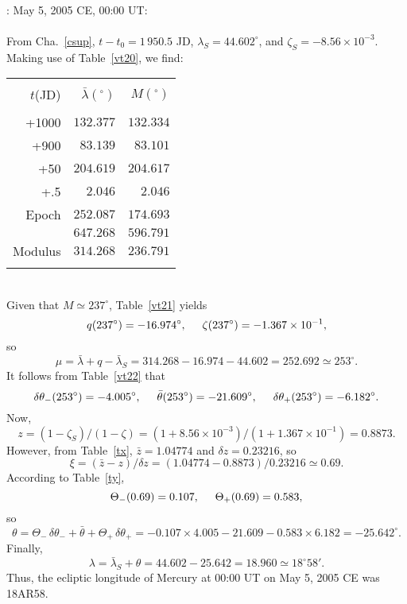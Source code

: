 ~\\
: May 5,  2005 CE, 00:00 UT:\\
~\\
From Cha.~\ref{csup}, $t-t_0=1\,950.5$ JD, $\lambda_S= 44.602^\circ$, and
$\zeta_S= -8.56\times 10^{-3}$. Making use of
Table~\ref{vt20}, we find:\\
\begin{tabular}{rrr}
&&\\
$t$(JD) & $ \bar{\lambda}(^\circ)$ & $M(^\circ)$\\[-2ex]
&&\\
+1000 & $132.377$ & $132.334$\\
+900 & $83.139$ & $83.101$\\
+50 & $204.619$ & $204.617$\\
+.5 & $2.046$ & $2.046$\\
Epoch & $252.087$ & $174.693$\\\cline{2-3}
&$647.268$ & $596.791$\\\cline{2-3}
Modulus & $314.268$ & $236.791$\\ 
&&\\
\end{tabular}\\
Given that $M\simeq 237^\circ$, Table~\ref{vt21} yields 
$$
q(237^\circ)= -16.974^\circ, \mbox{\hspace{0.5cm}}\zeta(237^\circ)=-1.367\times 10^{-1},
$$
so
$$
\mu=\bar{\lambda}+q-\bar{\lambda}_S = 314.268-16.974-44.602= 252.692\simeq
253^\circ.
$$
It follows from Table~\ref{vt22}
that 
$$
\delta\theta_-(253^\circ) = -4.005^\circ,\mbox{\hspace{0.5cm}}\bar{\theta}(253^\circ)=-21.609^\circ, \mbox{\hspace{0.5cm}}\delta\theta_+(253^\circ) = -6.182^\circ.
$$
Now, 
$$
z= (1-\zeta_S)/(1-\zeta) = (1+8.56\times 10^{-3})/(1+1.367\times 10^{-1}) =
0.8873.
$$
However, from Table~\ref{tx}, $\bar{z}= 1.04774$ and $\delta z = 0.23216$, so
$$
\xi = (\bar{z}-z)/\delta z = (1.04774-0.8873)/0.23216 \simeq 0.69.
$$
According to Table~\ref{ty}, 
$$
\Theta_-(0.69) = 0.107, \mbox{\hspace{0.5cm}}\Theta_+(0.69) = 0.583,
$$
so
$$
\theta  = \Theta_-\,\delta\theta_- + \bar{\theta}+\Theta_+\,\delta\theta_+ = -0.107\times 4.005 -21.609-0.583\times 6.182 = -25.642^\circ.
$$
Finally,
$$
\lambda=\bar{\lambda}_S + \theta= 44.602-25.642=18.960 \simeq 18^\circ 58'. 
$$
Thus,
the ecliptic longitude of Mercury at 00:00 UT on May 5, 2005 CE was 18AR58.

